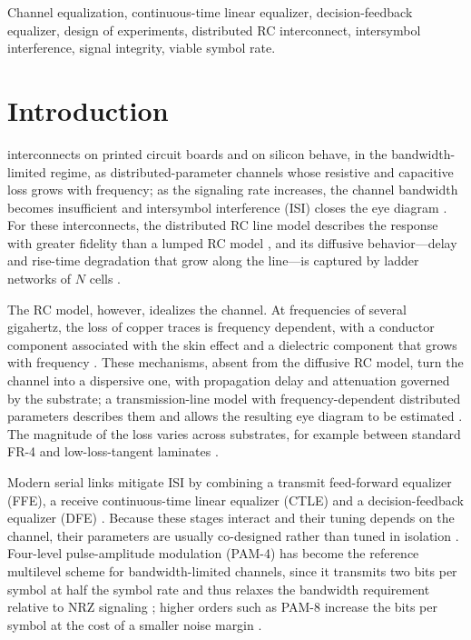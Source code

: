 \documentclass{ieeeaccess}
\begin{document}
\begin{keywords}
Channel equalization, continuous-time linear equalizer, decision-feedback
equalizer, design of experiments, distributed RC interconnect,
intersymbol interference, signal integrity, viable symbol rate.
\end{keywords}

\titlepgskip=-21pt

\maketitle

\section{Introduction}
\label{sec:intro}

 interconnects on printed circuit boards and on silicon
behave, in the bandwidth-limited regime, as distributed-parameter channels
whose resistive and capacitive loss grows with frequency; as the signaling
rate increases, the channel bandwidth becomes insufficient and intersymbol
interference (ISI) closes the eye diagram \cite{10370948}. For these
interconnects, the distributed RC line model describes the response with
greater fidelity than a lumped RC model \cite{761200}, and its diffusive
behavior---delay and rise-time degradation that grow along the line---is
captured by ladder networks of $N$ cells \cite{5697500}.

The RC model, however, idealizes the channel. At frequencies of several
gigahertz, the loss of copper traces is frequency dependent, with a
conductor component associated with the skin effect and a dielectric
component that grows with frequency \cite{9888577,915226}. These mechanisms,
absent from the diffusive RC model, turn the channel into a dispersive one,
with propagation delay and attenuation governed by the substrate; a
transmission-line model with frequency-dependent distributed parameters
describes them and allows the resulting eye diagram to be estimated
\cite{8861405,7445206}. The magnitude of the loss varies across substrates,
for example between standard FR-4 and low-loss-tangent laminates
\cite{9785524,10385078}.

Modern serial links mitigate ISI by combining a transmit feed-forward
equalizer (FFE), a receive continuous-time linear equalizer (CTLE) and a
decision-feedback equalizer (DFE) \cite{10260232,10811094}. Because these
stages interact and their tuning depends on the channel, their parameters
are usually co-designed rather than tuned in isolation \cite{11169790}.
Four-level pulse-amplitude modulation (PAM-4) has become the reference
multilevel scheme for bandwidth-limited channels, since it transmits two
bits per symbol at half the symbol rate and thus relaxes the bandwidth
requirement relative to NRZ signaling \cite{7964959,7193371}; higher orders
such as PAM-8 increase the bits per symbol at the cost of a smaller noise
margin \cite{8963973}.
\end{document}
